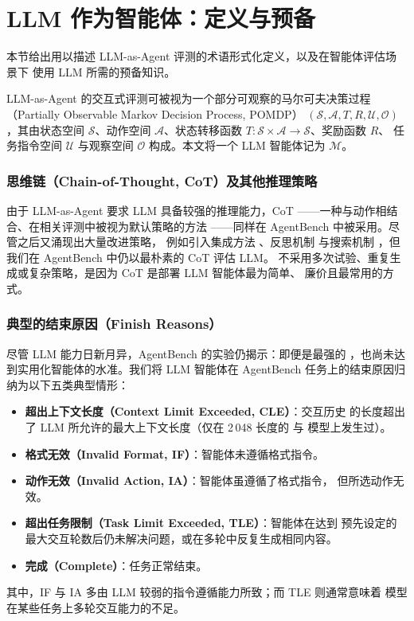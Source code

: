 
\section{LLM 作为智能体：定义与预备}

本节给出用以描述 LLM-as-Agent 评测的术语形式化定义，以及在智能体评估场景下
使用 LLM 所需的预备知识。

\begin{definition}
LLM-as-Agent 的交互式评测可被视为一个部分可观察的马尔可夫决策过程
（Partially Observable Markov Decision Process, POMDP）
$(\mathcal{S}, \mathcal{A}, T, R, \mathcal{U}, \mathcal{O})$，其由状态空间
$\mathcal{S}$、动作空间 $\mathcal{A}$、状态转移函数
$T\colon \mathcal{S}\times\mathcal{A}\to\mathcal{S}$、奖励函数 $R$、
任务指令空间 $\mathcal{U}$ 与观察空间 $\mathcal{O}$ 构成。本文将一个 LLM
智能体记为 $\mathcal{M}$。
\end{definition}

\subsubsection*{思维链（Chain-of-Thought, CoT）及其他推理策略}

由于 LLM-as-Agent 要求 LLM 具备较强的推理能力，CoT
\citep{wei2022b}——一种与动作相结合、在相关评测中被视为默认策略的方法
\citep{yao2023b}——同样在 AgentBench 中被采用。尽管之后又涌现出大量改进策略，
例如引入集成方法 \citep{wang2023c}、反思机制 \citep{shinn2023} 与搜索机制
\citep{yao2023a}，但我们在 AgentBench 中仍以最朴素的 CoT 评估 LLM。
不采用多次试验、重复生成或复杂策略，是因为 CoT 是部署 LLM 智能体最为简单、
廉价且最常用的方式。

\subsubsection*{典型的结束原因（Finish Reasons）}

尽管 LLM 能力日新月异，AgentBench 的实验仍揭示：即便是最强的
，也尚未达到实用化智能体的水准。我们将 LLM 智能体在
AgentBench 任务上的结束原因归纳为以下五类典型情形：

\begin{itemize}
    \item \textbf{超出上下文长度（Context Limit Exceeded, CLE）}：交互历史
          的长度超出了 LLM 所允许的最大上下文长度（仅在 2\,048 长度的
           与  模型上发生过）。
    \item \textbf{格式无效（Invalid Format, IF）}：智能体未遵循格式指令。
    \item \textbf{动作无效（Invalid Action, IA）}：智能体虽遵循了格式指令，
          但所选动作无效。
    \item \textbf{超出任务限制（Task Limit Exceeded, TLE）}：智能体在达到
          预先设定的最大交互轮数后仍未解决问题，或在多轮中反复生成相同内容。
    \item \textbf{完成（Complete）}：任务正常结束。
\end{itemize}

其中，IF 与 IA 多由 LLM 较弱的指令遵循能力所致；而 TLE 则通常意味着
模型在某些任务上多轮交互能力的不足。
